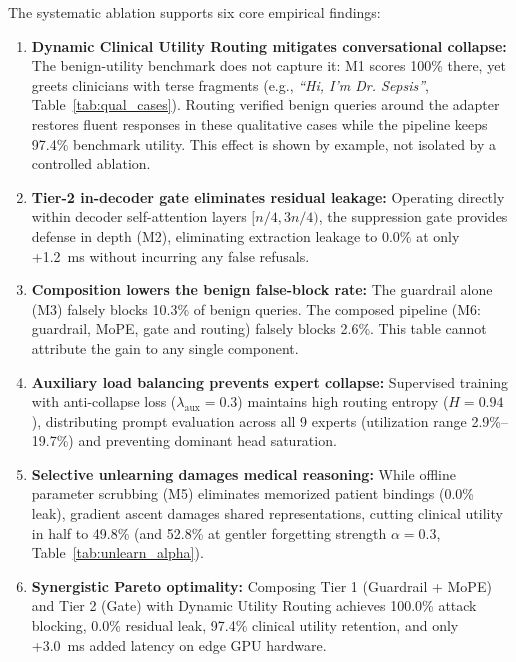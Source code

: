 \documentclass[lettersize,journal]{IEEEtran}
\begin{document}
The systematic ablation supports six core empirical findings:
\begin{enumerate}
    \item \textbf{Dynamic Clinical Utility Routing mitigates conversational collapse:} The benign-utility benchmark does not capture it: M1 scores 100\% there, yet greets clinicians with terse fragments (e.g., \textit{``Hi, I'm Dr. Sepsis''}, Table~\ref{tab:qual_cases}). Routing verified benign queries around the adapter restores fluent responses in these qualitative cases while the pipeline keeps 97.4\% benchmark utility. This effect is shown by example, not isolated by a controlled ablation.
    \item \textbf{Tier-2 in-decoder gate eliminates residual leakage:} Operating directly within decoder self-attention layers $[n/4, 3n/4)$, the suppression gate provides defense in depth (M2), eliminating extraction leakage to 0.0\% at only +1.2~ms without incurring any false refusals.
    \item \textbf{Composition lowers the benign false-block rate:} The guardrail alone (M3) falsely blocks 10.3\% of benign queries. The composed pipeline (M6: guardrail, MoPE, gate and routing) falsely blocks 2.6\%. This table cannot attribute the gain to any single component.
    \item \textbf{Auxiliary load balancing prevents expert collapse:} Supervised training with anti-collapse loss ($\lambda_{\mathrm{aux}}=0.3$) maintains high routing entropy ($H=0.94$), distributing prompt evaluation across all 9 experts (utilization range 2.9\%--19.7\%) and preventing dominant head saturation.
    \item \textbf{Selective unlearning damages medical reasoning:} While offline parameter scrubbing (M5) eliminates memorized patient bindings (0.0\% leak), gradient ascent damages shared representations, cutting clinical utility in half to 49.8\% (and 52.8\% at gentler forgetting strength $\alpha=0.3$, Table~\ref{tab:unlearn_alpha}).
    \item \textbf{Synergistic Pareto optimality:} Composing Tier 1 (Guardrail + MoPE) and Tier 2 (Gate) with Dynamic Utility Routing achieves 100.0\% attack blocking, 0.0\% residual leak, 97.4\% clinical utility retention, and only +3.0~ms added latency on edge GPU hardware.
\end{enumerate}
\end{document}
